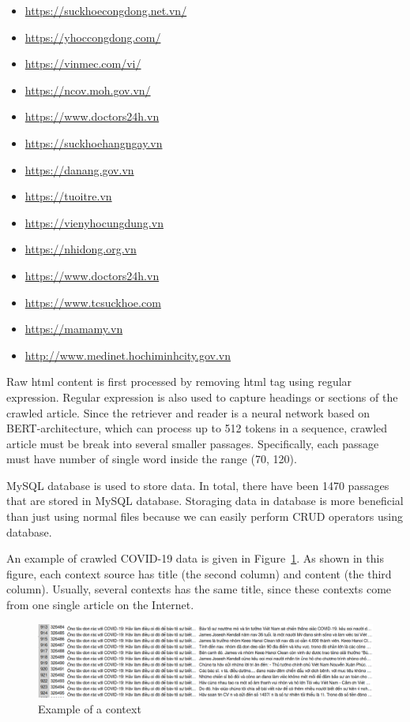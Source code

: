 \documentclass[12pt, sort&compress]{report}
\begin{document}
\begin{itemize}
	\item \url{https://suckhoecongdong.net.vn/}
	\item \url{https://yhoccongdong.com/}
	\item \url{https://vinmec.com/vi/}
	\item \url{https://ncov.moh.gov.vn/}
	\item \url{https://www.doctors24h.vn}
	\item \url{https://suckhoehangngay.vn}
	\item \url{https://danang.gov.vn}
	\item \url{https://tuoitre.vn}
	\item \url{https://vienyhocungdung.vn}
	\item \url{https://nhidong.org.vn}
	\item \url{https://www.doctors24h.vn}
	\item \url{https://www.tcsuckhoe.com}
	\item \url{https://mamamy.vn}
	\item \url{http://www.medinet.hochiminhcity.gov.vn}
\end{itemize}
Raw html content is first processed by removing html tag using regular expression. Regular expression is also used to capture headings or sections of the crawled article. Since the retriever and reader is a neural network based on BERT-architecture, which can process up to 512 tokens in a sequence, crawled article must be break into several smaller passages. Specifically, each passage must have number of single word inside the range (70, 120).
\par MySQL database is used to store data. In total, there have been 1470 passages that are stored in MySQL database. Storaging data in database is more beneficial than just using normal files because we can easily perform CRUD operators using database. 
\par An example of crawled COVID-19 data is given in Figure~\ref{fig:09}. As shown in this figure, each context source has title (the second column) and content (the third column). Usually, several contexts has the same title, since these contexts come from one single article on the Internet. 
\begin{figure}
	\centering
	\includegraphics[scale=.5]{images/crawled_data.png}
	\caption{Example of a context}
	\label{fig:09}
\end{figure}
\end{document}
